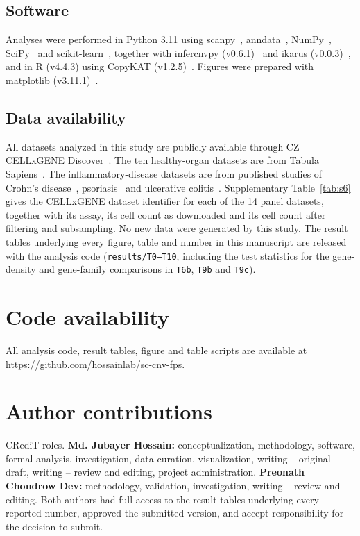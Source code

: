 \documentclass[11pt,letterpaper]{article}
\begin{document}
\subsection{Software}

Analyses were performed in Python 3.11 using scanpy~\cite{scanpy}, anndata~\cite{anndata}, NumPy~\cite{numpy}, SciPy~\cite{scipy} and scikit-learn~\cite{sklearn}, together with infercnvpy (v0.6.1)~\cite{infercnvpy} and ikarus (v0.0.3)~\cite{ikarus}, and in R (v4.4.3) using CopyKAT (v1.2.5)~\cite{copykat}. Figures were prepared with matplotlib (v3.11.1)~\cite{matplotlib}.

\subsection{Data availability}

All datasets analyzed in this study are publicly available through CZ CELLxGENE Discover~\cite{cellxgene2025}. The ten healthy-organ datasets are from Tabula Sapiens~\cite{tabula}. The inflammatory-disease datasets are from published studies of Crohn's disease~\cite{kong2023}, psoriasis~\cite{gao2021pso} and ulcerative colitis~\cite{smillie2019}. Supplementary Table~\ref{tab:s6} gives the CELLxGENE dataset identifier for each of the 14 panel datasets, together with its assay, its cell count as downloaded and its cell count after filtering and subsampling. No new data were generated by this study. The result tables underlying every figure, table and number in this manuscript are released with the analysis code (\texttt{results/T0--T10}, including the test statistics for the gene-density and gene-family comparisons in \texttt{T6b}, \texttt{T9b} and \texttt{T9c}).

\section*{Code availability}
All analysis code, result tables, figure and table scripts are available at \url{https://github.com/hossainlab/sc-cnv-fps}.

\section*{Author contributions}
CRediT roles. \textbf{Md. Jubayer Hossain:} conceptualization, methodology, software, formal analysis, investigation, data curation, visualization, writing -- original draft, writing -- review and editing, project administration. \textbf{Preonath Chondrow Dev:} methodology, validation, investigation, writing -- review and editing. Both authors had full access to the result tables underlying every reported number, approved the submitted version, and accept responsibility for the decision to submit.
\end{document}

